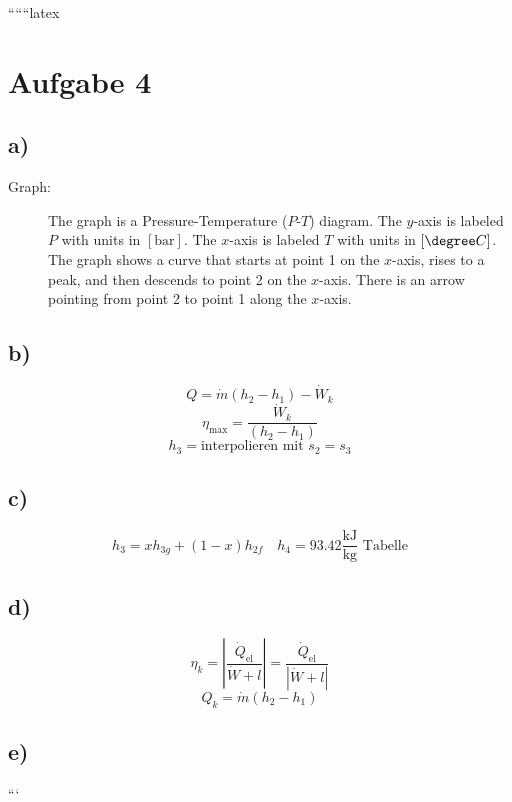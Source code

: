 
``````latex


\section*{Aufgabe 4}

\subsection*{a)}
\begin{description}
    \item[Graph:] The graph is a Pressure-Temperature ($P$-$T$) diagram. The $y$-axis is labeled $P$ with units in $[\text{bar}]$. The $x$-axis is labeled $T$ with units in $[\degree C]$. The graph shows a curve that starts at point 1 on the $x$-axis, rises to a peak, and then descends to point 2 on the $x$-axis. There is an arrow pointing from point 2 to point 1 along the $x$-axis.
\end{description}

\subsection*{b)}
\[
Q = \dot{m} (h_2 - h_1) - \dot{W}_k
\]
\[
\eta_{\text{max}} = \frac{\dot{W}_k}{(h_2 - h_1)}
\]
\[
h_3 = \text{interpolieren mit } s_2 = s_3
\]

\subsection*{c)}
\[
h_3 = x h_{3g} + (1 - x) h_{2f} \quad h_4 = 93.42 \frac{\text{kJ}}{\text{kg}} \text{ Tabelle}
\]

\subsection*{d)}
\[
\eta_k = \left| \frac{\dot{Q}_{\text{el}}}{\dot{W} + l} \right| = \frac{\dot{Q}_{\text{el}}}{\left| \dot{W} + l \right|}
\]
\[
Q_k = \dot{m} (h_2 - h_1)
\]

\subsection*{e)}
\]

```
